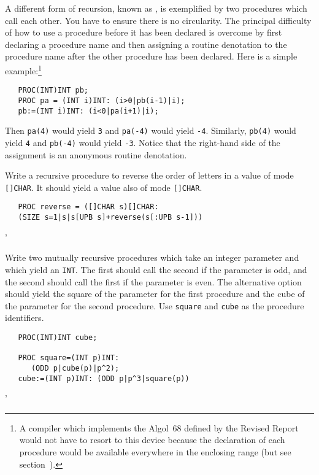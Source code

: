 A different form of recursion, known as , is
exemplified by two procedures which call each other. You have to
ensure there is no circularity. The principal difficulty of how to
use a procedure before it has been declared is overcome by first
declaring a procedure name and then assigning a routine denotation to
the procedure name after the other procedure has been declared. Here
is a simple example:\footnote{A compiler which implements the
Algol~68 defined by the Revised Report would not have to resort to
this device because the declaration of each procedure would be
available everywhere in the enclosing range (but see
section~).}
\begin{verbatim}
   PROC(INT)INT pb;
   PROC pa = (INT i)INT: (i>0|pb(i-1)|i);
   pb:=(INT i)INT: (i<0|pa(i+1)|i);
\end{verbatim}
\noindent
Then \verb|pa(4)| would yield \verb|3| and \verb|pa(-4)| would yield
\verb|-4|. Similarly, \verb|pb(4)| would yield \verb|4| and
\verb|pb(-4)| would yield \verb|-3|. Notice that the right-hand side of
the assignment is an anonymous routine denotation.

\begin{exercise}
\item Write a recursive procedure to reverse the order of letters in a
value of mode \verb|[]CHAR|. It should yield a value also of mode
\verb|[]CHAR|. \ans \ %
\begin{verbatim}
   PROC reverse = ([]CHAR s)[]CHAR:
   (SIZE s=1|s|s[UPB s]+reverse(s[:UPB s-1]))
\end{verbatim}
'
\item Write two mutually recursive procedures which take an
integer parameter and which yield an \verb|INT|. The first should call
the second if the parameter is odd, and the second should call the
first if the parameter is even. The alternative option should yield the
square of the parameter for the first procedure and the cube of the
parameter for the second procedure. Use \verb|square| and \verb|cube|
as the procedure identifiers. \ans \ %
\begin{verbatim}
   PROC(INT)INT cube;

   PROC square=(INT p)INT:
      (ODD p|cube(p)|p^2);
   cube:=(INT p)INT: (ODD p|p^3|square(p))
\end{verbatim}
\noindent
'
\end{exercise}

